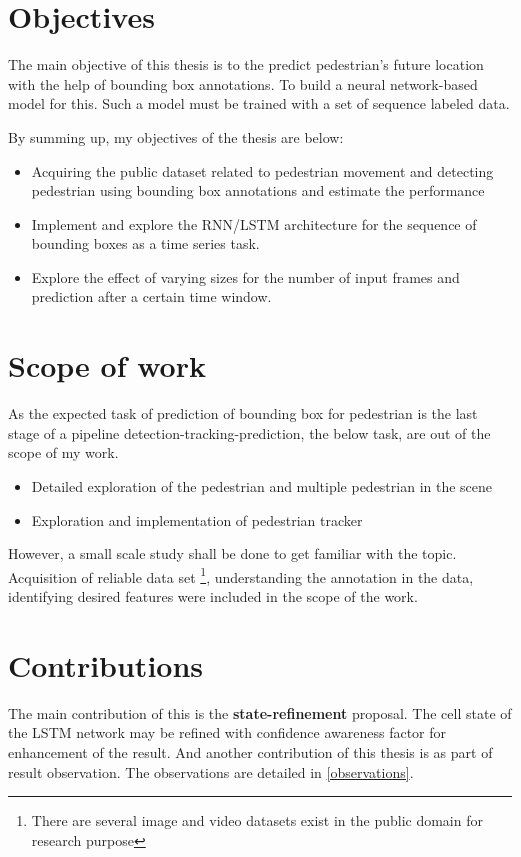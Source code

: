 \section{Objectives}
\newpara The main objective of this thesis is to the predict pedestrian's future location with the help of bounding box annotations. To build a neural network-based model for this. Such a model must be trained with a set of sequence labeled data.

By summing up, my objectives of the thesis are below:
\begin{itemize}
	\item  Acquiring the public dataset related to pedestrian movement and detecting pedestrian using bounding box annotations and estimate the performance

	\item Implement and explore the RNN/LSTM architecture for the sequence of bounding boxes as a time series task.
	\item Explore the effect of varying sizes for the number of input frames and prediction after a certain time window.
\end{itemize}

\section{Scope of work}
As the expected task of prediction of bounding box for pedestrian is the last stage of a pipeline detection-tracking-prediction, the below task, are out of the scope of my work.
\begin{itemize}
	\item Detailed exploration of the pedestrian and multiple pedestrian in the scene
	\item Exploration and implementation of pedestrian tracker
\end{itemize}
However, a small scale study shall be done to get familiar with the topic.  Acquisition of reliable data set \footnote{There are several image and video datasets exist in the public domain for research purpose}, understanding the annotation in the data, identifying desired features were included in the scope of the work.

\section{Contributions}
The main contribution of this is the \textbf{state-refinement } proposal. The cell state of the LSTM network may be refined with confidence awareness factor for enhancement of the result. And another contribution of this thesis is as part of result observation. The observations are detailed in \ref{observations}.

